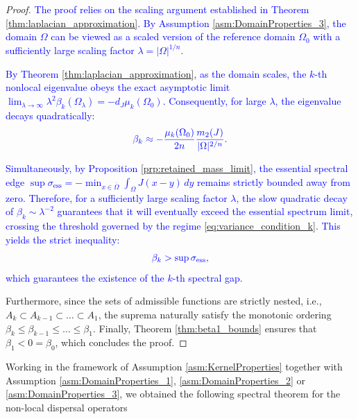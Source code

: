 \documentclass[12pt, a4paper]{article}
\newcommand{\revision}[1]{\textcolor{blue}{#1}}
\theoremstyle{break}
\theoremstyle{break}
\theoremstyle{break}
\theoremstyle{break}
\theoremstyle{break}
\theoremstyle{break}
\theoremstyle{break}
\theoremstyle{break}
\theoremstyle{break}
\begin{document}
\begin{proof}
    \revision{The proof relies on the scaling argument established in Theorem \ref{thm:laplacian_approximation}. By Assumption \ref{asm:DomainProperties_3}, the domain $\Omega$ can be viewed as a scaled version of the reference domain $\Omega_0$ with a sufficiently large scaling factor $\lambda = |\Omega|^{1/n}$.} 
    
    \revision{By Theorem \ref{thm:laplacian_approximation}, as the domain scales, the $k$-th nonlocal eigenvalue obeys the exact asymptotic limit $\lim_{\lambda \to \infty} \lambda^2 \beta_k(\Omega_\lambda) = -d_J \mu_k(\Omega_0)$. Consequently, for large $\lambda$, the eigenvalue decays quadratically:}
    \begin{equation*}
        \revision{\beta_k \approx - \frac{\mu_k(\Omega_0)}{2n} \frac{m_2(J)}{|\Omega|^{2/n}}.}
    \end{equation*}
    
    \revision{Simultaneously, by Proposition \ref{prp:retained_mass_limit}, the essential spectral edge $\sup \sigma_{\mathrm{ess}} = -\min_{x \in \overline{\Omega}} \int_\Omega J(x-y) \, dy$ remains strictly bounded away from zero. Therefore, for a sufficiently large scaling factor $\lambda$, the slow quadratic decay of $\beta_k \sim \lambda^{-2}$ guarantees that it will eventually exceed the essential spectrum limit, crossing the threshold governed by the regime \eqref{eq:variance_condition_k}. This yields the strict inequality:}
    \begin{equation*}
        \revision{\beta_k > \sup \sigma_{\mathrm{ess}},}
    \end{equation*}
    \revision{which guarantees the existence of the $k$-th spectral gap.} 

    Furthermore, since the sets of admissible functions are strictly nested, i.e., $A_k \subset A_{k-1} \subset \dots \subset A_1$, the suprema naturally satisfy the monotonic ordering $\beta_k \leq \beta_{k-1} \leq \dots \leq \beta_1$. Finally, Theorem \ref{thm:beta1_bounds} ensures that $\beta_1 < 0 = \beta_0$, which concludes the proof.
\end{proof}

Working in the framework of Assumption \ref{asm:KernelProperties} together with Assumption \ref{asm:DomainProperties_1}, \ref{asm:DomainProperties_2} or \ref{asm:DomainProperties_3}, we obtained the following spectral theorem for the non-local dispersal operators
\end{document}
